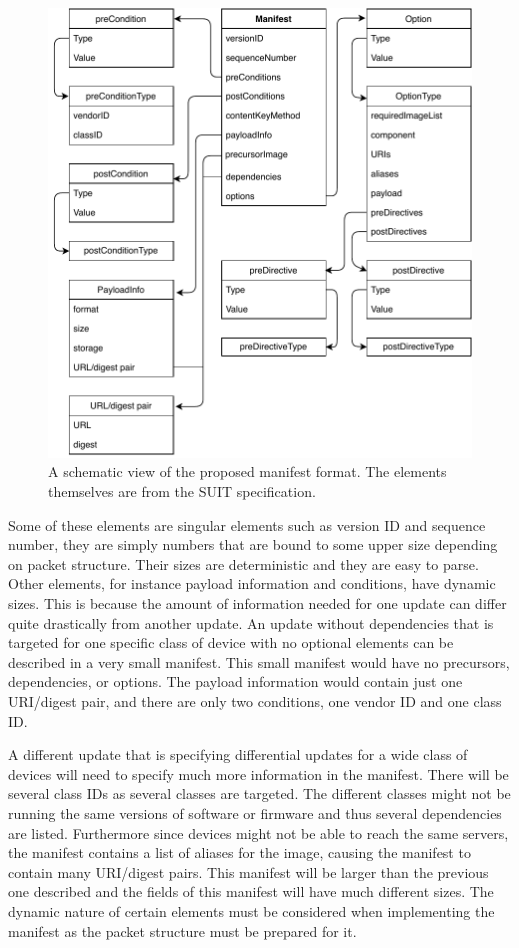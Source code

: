\documentclass[0-thesis.tex]{subfiles}
\begin{document}
\begin{figure}
    \caption{A schematic view of the proposed manifest format. The elements themselves are from the SUIT specification.}
    \label{fig:manifest-format}
    \includegraphics{images/manifest-format.pdf}
\end{figure}

Some of these elements are singular elements such as version ID and sequence number, they
are simply numbers that are bound to some upper size depending on packet structure. Their
sizes are deterministic and they are easy to parse. Other elements, for instance payload
information and conditions, have dynamic sizes. This is because the amount of information
needed for one update can differ quite drastically from another update. An update without
dependencies that is targeted for one specific class of device with no optional elements
can be described in a very small manifest. This small manifest would have no precursors,
dependencies, or options. The payload information would contain just one URI/digest pair,
and there are only two conditions, one vendor ID and one class ID.

A different update that is specifying differential updates for a wide class of devices
will need to specify much more information in the manifest. There will be several class
IDs as several classes are targeted. The different classes might not be running the same
versions of software or firmware and thus several dependencies are listed. Furthermore
since devices might not be able to reach the same servers, the manifest contains a list of
aliases for the image, causing the manifest to contain many URI/digest pairs. This
manifest will be larger than the previous one described and the fields of this manifest
will have much different sizes. The dynamic nature of certain elements must be considered
when implementing the manifest as the packet structure must be prepared for it. 
\end{document}
